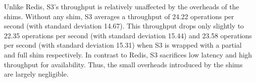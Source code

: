 Unlike Redis, S3's throughput is relatively unaffected by the overheads of the
shims. Without any shim, S3 averages a throughput of 24.22 operations per
second (with standard deviation 14.67). This throughput drops only slightly to
22.35 operations per second (with standard deviation 15.44) and 23.58
operations per second (with standard deviation 15.31) when S3 is wrapped with a
partial and full\fluent{} shim respectively. In contrast to Redis, S3
sacrifices low latency and high throughput for availability. Thus, the small
overheads introduced by the shims are largely negligible.
